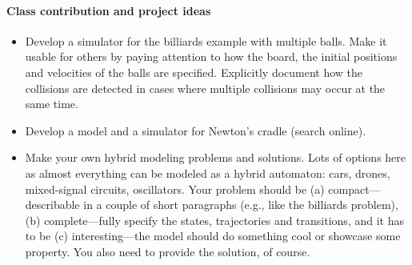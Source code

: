 \documentclass[11pt]{article}
\begin{document}
\paragraph{Class contribution and project ideas}
\begin{itemize}
\item Develop a simulator for the billiards example with multiple balls. Make it usable for others by paying attention to how the board, the initial positions and velocities of the balls are specified. Explicitly document how the collisions are detected in cases where multiple collisions may occur at the same time.
\item Develop a model and a simulator for Newton's cradle (search online).
\item Make your own  hybrid modeling problems and solutions. Lots of options here as almost everything can be modeled as a hybrid automaton: cars, drones, mixed-signal circuits, oscillators. Your problem should be (a) compact---describable in a couple of short paragraphs (e.g., like the billiards problem), (b) complete---fully specify the states, trajectories and transitions, and it has to be (c) interesting---the model should do something cool or showcase some property. You also need to provide the solution, of course.
\end{itemize}

%
%	
\end{document}
